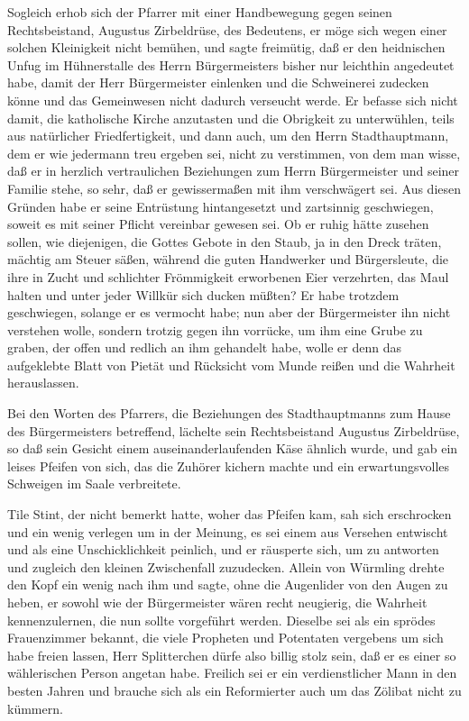 Sogleich erhob sich der Pfarrer mit einer Handbewegung gegen seinen
Rechtsbeistand, Augustus Zirbeldrüse, des Bedeutens, er möge sich
wegen einer solchen Kleinigkeit nicht bemühen, und sagte freimütig,
daß er den heidnischen Unfug im Hühnerstalle des Herrn
Bürgermeisters bisher nur leichthin angedeutet habe, damit der Herr
Bürgermeister einlenken und die Schweinerei zudecken könne und das
Gemeinwesen nicht dadurch verseucht werde. Er befasse sich nicht
damit, die katholische Kirche anzutasten und die Obrigkeit zu
unterwühlen, teils aus natürlicher Friedfertigkeit, und dann auch,
um den Herrn Stadthauptmann, dem er wie jedermann treu ergeben sei,
nicht zu verstimmen, von dem man wisse, daß er in herzlich
vertraulichen Beziehungen zum Herrn Bürgermeister und seiner
Familie stehe, so sehr, daß er gewissermaßen mit ihm verschwägert
sei. Aus diesen Gründen habe er seine Entrüstung hintangesetzt und
zartsinnig geschwiegen, soweit es mit seiner Pflicht vereinbar
gewesen sei. Ob er ruhig hätte zusehen sollen, wie diejenigen, die
Gottes Gebote in den Staub, ja in den Dreck träten, mächtig am
Steuer säßen, während die guten Handwerker und Bürgersleute, die
ihre in Zucht und schlichter Frömmigkeit erworbenen Eier
verzehrten, das Maul halten und unter jeder Willkür sich ducken
müßten? Er habe trotzdem geschwiegen, solange er es vermocht habe;
nun aber der Bürgermeister ihn nicht verstehen wolle, sondern
trotzig gegen ihn vorrücke, um ihm eine Grube zu graben, der offen
und redlich an ihm gehandelt habe, wolle er denn das aufgeklebte
Blatt von Pietät und Rücksicht vom Munde reißen und die Wahrheit
herauslassen.

\pagenum{[26]} Bei den Worten des Pfarrers, die Beziehungen des
Stadthauptmanns zum Hause des Bürgermeisters betreffend, lächelte
sein Rechtsbeistand Augustus Zirbeldrüse, so daß sein Gesicht einem
auseinanderlaufenden Käse ähnlich wurde, und gab ein leises Pfeifen
von sich, das die Zuhörer kichern machte und ein erwartungsvolles
Schweigen im Saale verbreitete.

Tile Stint, der nicht bemerkt hatte, woher das Pfeifen kam, sah
sich erschrocken und ein wenig verlegen um in der Meinung, es sei
einem aus Versehen entwischt und als eine Unschicklichkeit
peinlich, und er räusperte sich, um zu antworten und zugleich den
kleinen Zwischenfall zuzudecken. Allein von Würmling drehte den
Kopf ein wenig nach ihm und sagte, ohne die Augenlider von den
Augen zu heben, er sowohl wie der Bürgermeister wären recht
neugierig, die Wahrheit kennenzulernen, die nun sollte vorgeführt
werden. Dieselbe sei als ein sprödes Frauenzimmer bekannt, die
viele Propheten und Potentaten vergebens um sich habe freien
lassen, Herr Splitterchen dürfe also billig stolz sein, daß er es
einer so wählerischen Person angetan habe. Freilich sei er ein
verdienstlicher Mann in den besten Jahren und brauche sich als ein
Reformierter auch um das Zölibat nicht zu kümmern.

